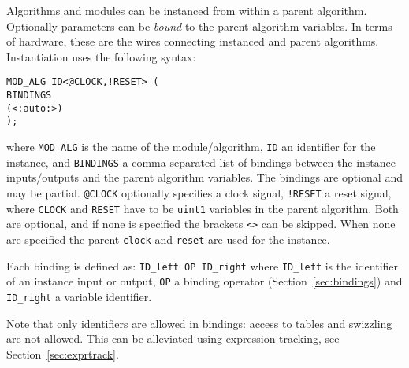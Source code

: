 \documentclass[a4]{article}
\begin{document}
Algorithms and modules can be instanced from within a parent algorithm. Optionally parameters can be \textit{bound} to the parent algorithm variables. 
In terms of hardware, these are the wires connecting instanced and parent algorithms.
%
Instantiation uses the following syntax:
%
\begin{verbatim}
MOD_ALG ID<@CLOCK,!RESET> (
BINDINGS
(<:auto:>)
);
\end{verbatim}
%
where \texttt{MOD\_ALG} is the name of the module/algorithm, \texttt{ID} an
identifier for the instance, and \texttt{BINDINGS} a comma separated list of 
bindings between the instance inputs/outputs and the parent algorithm variables.
The bindings are optional and may be partial.
\texttt{@CLOCK} optionally specifies a clock signal, \texttt{!RESET} a reset signal, where \texttt{CLOCK} and \texttt{RESET} have to be \texttt{uint1} variables in the parent algorithm. Both are optional, and if none is specified the brackets \texttt{<>} can be skipped. When none are specified the parent \texttt{clock} and \texttt{reset} are used for the instance.

Each binding is defined as:
\texttt{ID\_left OP ID\_right} 
where \texttt{ID\_left}
is the identifier of an instance input or output, \texttt{OP} a binding
operator (Section~\ref{sec:bindings}) and \texttt{ID\_right} a variable identifier.

Note that only identifiers are allowed in bindings: access to tables and swizzling are not allowed. This can be alleviated using expression tracking, see Section~\ref{sec:exprtrack}.
\end{document}
